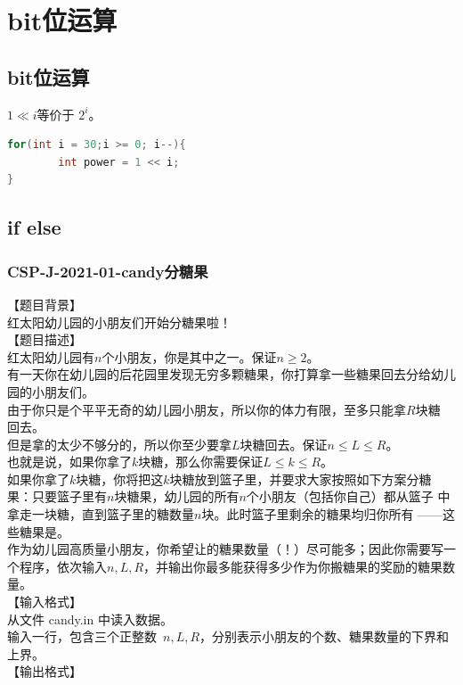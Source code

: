 \documentclass[12pt,twiside,a4paper]{ctexbook}
\numberwithin{chapter}{part}
\begin{document}
\chapter{bit位运算}
\section{bit位运算}
$1\ll i$等价于 $2^i$。
\begin{lstlisting}[language=C++]
for(int i = 30;i >= 0; i--){
		int power = 1 << i;
}
\end{lstlisting}

\section{if else}
\subsection{CSP-J-2021-01-candy分糖果}
【题目背景】\\
红太阳幼儿园的小朋友们开始分糖果啦！\\
【题目描述】\\
红太阳幼儿园有$n$个小朋友，你是其中之一。保证$n\geq2$。\\
有一天你在幼儿园的后花园里发现无穷多颗糖果，你打算拿一些糖果回去分给幼儿
园的小朋友们。\\
由于你只是个平平无奇的幼儿园小朋友，所以你的体力有限，至多只能拿$R$块糖
回去。\\
但是拿的太少不够分的，所以你至少要拿$L$块糖回去。保证$n\leq L\leq R$。\\
也就是说，如果你拿了$k$块糖，那么你需要保证$L\leq k\leq R$。\\
如果你拿了$k$块糖，你将把这$k$块糖放到篮子里，并要求大家按照如下方案分糖
果：只要篮子里有$n$块糖果，幼儿园的所有$n$个小朋友（包括你自己）都从篮子
中拿走一块糖，直到篮子里的糖数量$n$块。此时篮子里剩余的糖果均归你所有
——这些糖果是。\\
作为幼儿园高质量小朋友，你希望让的糖果数量（！）尽可能多；因此你需要写一个程序，依次输入$n, L, R$，并输出你最多能获得多少作为你搬糖果的奖励的糖果数量。\\
【输入格式】\\
从文件 candy.in 中读入数据。\\
输入一行，包含三个正整数 $n, L, R$，分别表示小朋友的个数、糖果数量的下界和上界。\\
【输出格式】\\
\end{document}
